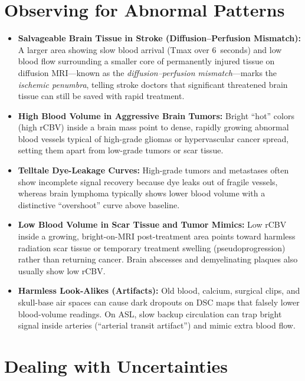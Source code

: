 \section{Observing for Abnormal Patterns}

\begin{itemize}
    \item \textbf{Salvageable Brain Tissue in Stroke (Diffusion--Perfusion Mismatch):} A larger area showing slow blood arrival (Tmax over 6~seconds) and low blood flow surrounding a smaller core of permanently injured tissue on diffusion MRI---known as the \textit{diffusion--perfusion mismatch}---marks the \textit{ischemic penumbra}, telling stroke doctors that significant threatened brain tissue can still be saved with rapid treatment.
    \item \textbf{High Blood Volume in Aggressive Brain Tumors:} Bright ``hot'' colors (high rCBV) inside a brain mass point to dense, rapidly growing abnormal blood vessels typical of high-grade gliomas or hypervascular cancer spread, setting them apart from low-grade tumors or scar tissue.
    \item \textbf{Telltale Dye-Leakage Curves:} High-grade tumors and metastases often show incomplete signal recovery because dye leaks out of fragile vessels, whereas brain lymphoma typically shows lower blood volume with a distinctive ``overshoot'' curve above baseline.
    \item \textbf{Low Blood Volume in Scar Tissue and Tumor Mimics:} Low rCBV inside a growing, bright-on-MRI post-treatment area points toward harmless radiation scar tissue or temporary treatment swelling (pseudoprogression) rather than returning cancer. Brain abscesses and demyelinating plaques also usually show low rCBV.
    \item \textbf{Harmless Look-Alikes (Artifacts):} Old blood, calcium, surgical clips, and skull-base air spaces can cause dark dropouts on DSC maps that falsely lower blood-volume readings. On ASL, slow backup circulation can trap bright signal inside arteries (``arterial transit artifact'') and mimic extra blood flow.
\end{itemize}

\section{Dealing with Uncertainties}

